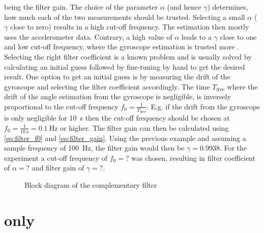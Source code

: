 being the filter gain.
The choice of the parameter $\alpha$ (and hence $\gamma$) determines, how much each of the two measurements should be trusted.
Selecting a small $\alpha$ ($\gamma$ close to zero) results in a high cut-off frequency.
The estimation then mostly uses the accelerometer data.
Contrary, a high value of $\alpha$ leads to a $\gamma$ close to one and low cut-off frequency, where the gyroscope estimation is trusted more \cite{1997Baerveldt}.\\
Selecting the right filter coefficient is a known problem and is usually solved by calculating an initial guess followed by fine-tuning by hand to get the desired result.
One option to get an initial guess is by measuring the drift of the gyroscope and selecting the filter coefficient accordingly.
The time $T_\mathrm{free}$ where the drift of the angle estimation from the gyroscope is negligible, is inversely proportional to the cut-off frequency $f_0 = \frac{1}{T_\mathrm{free}}$.
E.g. if the drift from the gyroscope is only negligible for \SI{10}{\second} then the cut-off frequency should be chosen at $f_0 = \frac{1}{\SI{10}{\second}} = \SI{0.1}{\hertz}$ or higher.
The filter gain can then be calculated using \cref{eq:filter_f0} and \cref{eq:filter_gain}.
Using the previous example and assuming a sample frequency of \SI{100}{\hertz}, the filter gain would then be $\gamma = 0.9938$.
For the experiment a cut-off frequency of $f_0=?$ was chosen, resulting in filter coefficient of $\alpha = ?$ and filter gain of $\gamma = ?$.
\begin{figure}[htb]
	\centering
	
	\caption{Block diagram of the complementary filter}
	\label{fig:tikz_complementary_filter}
\end{figure}

\section{ only}

